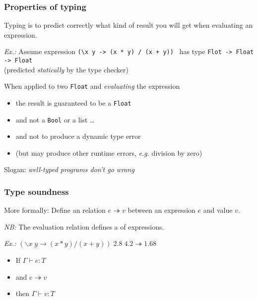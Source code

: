 \documentclass{beamer}
\begin{document}
\begin{frame}[fragile]\frametitle{Properties of typing}

  Typing is to predict correctly what kind of result you will get when
  evaluating an expression.

  \emph{Ex.:} Assume expression \verb|(\x y -> (x * y) / (x + y)) | has type
  \texttt{Flot -> Float -> Float}\\
  (predicted \emph{statically} by the type checker)

\vspace{3mm}
  When applied to two \texttt{Float} and \emph{evaluating} the expression
  \begin{itemize}
  \item the result is guaranteed to be a \texttt{Float}
  \item and not a \texttt{Bool} or a list \dots
  \item and not to produce a dynamic type error
  \item (but may produce other runtime errors, \emph{e.g.} division by zero)
  \end{itemize}
  Slogan: \emph{well-typed programs don't go wrong}

\end{frame}

\begin{frame}[fragile]\frametitle{Type soundness}

  More formally: Define an  relation $e \twoheadrightarrow v$
  between an expression $e$ and value $v$.

  \vspace{2mm}
  \emph{NB:} The evaluation relation defines a  of expressions.

  \vspace{2mm}
  \emph{Ex.:} $(\backslash x\; y \to (x * y) / (x + y))\; 2.8\; 4.2
  \twoheadrightarrow 1.68$

  \vspace{4mm}
  \begin{itemize}
  \item If $\Gamma \vdash e : T$
  \item and $e \twoheadrightarrow v$
  \item then $\Gamma \vdash v : T$
  \end{itemize}
  

\end{frame}
\end{document}
